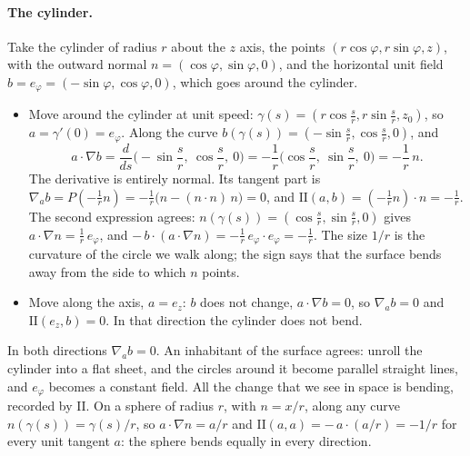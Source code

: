 \paragraph{The cylinder.} Take the cylinder of radius $r$ about the $z$ axis, the points $(r\cos\varphi, r\sin\varphi, z)$, with the outward normal $n = (\cos\varphi, \sin\varphi, 0)$, and the horizontal unit field $b = e_\varphi = (-\sin\varphi, \cos\varphi, 0)$, which goes around the cylinder.
\begin{itemize}
\item Move around the cylinder at unit speed: $\gamma(s) = (r\cos\frac sr, r\sin\frac sr, z_0)$, so $a = \gamma'(0) = e_\varphi$. Along the curve $b(\gamma(s)) = (-\sin\frac sr, \cos\frac sr, 0)$, and
\begin{equation*}
a\cdot\nabla b = \frac{d}{ds}\Big(-\sin\frac sr,\ \cos\frac sr,\ 0\Big) = -\frac1r\Big(\cos\frac sr,\ \sin\frac sr,\ 0\Big) = -\frac1r\, n .
\end{equation*}
The derivative is entirely normal. Its tangent part is $\nabla_a b = P(-\frac1r n) = -\frac1r\big(n - (n\cdot n)\,n\big) = 0$, and $\mathrm{II}(a, b) = (-\frac1r n)\cdot n = -\frac1r$. The second expression agrees: $n(\gamma(s)) = (\cos\frac sr, \sin\frac sr, 0)$ gives $a\cdot\nabla n = \frac1r\,e_\varphi$, and $-\,b\cdot(a\cdot\nabla n) = -\frac1r\, e_\varphi\cdot e_\varphi = -\frac1r$. The size $1/r$ is the curvature of the circle we walk along; the sign says that the surface bends away from the side to which $n$ points.
\item Move along the axis, $a = e_z$: $b$ does not change, $a\cdot\nabla b = 0$, so $\nabla_a b = 0$ and $\mathrm{II}(e_z, b) = 0$. In that direction the cylinder does not bend.
\end{itemize}
In both directions $\nabla_a b = 0$. An inhabitant of the surface agrees: unroll the cylinder into a flat sheet, and the circles around it become parallel straight lines, and $e_\varphi$ becomes a constant field. All the change that we see in space is bending, recorded by $\mathrm{II}$. On a sphere of radius $r$, with $n = x/r$, along any curve $n(\gamma(s)) = \gamma(s)/r$, so $a\cdot\nabla n = a/r$ and $\mathrm{II}(a, a) = -\,a\cdot(a/r) = -1/r$ for every unit tangent $a$: the sphere bends equally in every direction.

